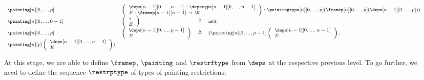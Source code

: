 \documentclass{msc}
\newcommand{\unittype}{\ensuremath{\mathsf{unit}}}
\newcommand{\unitpoint}{\ensuremath{\ast}}
\newcommand{\defeq}{\ensuremath{\triangleq}}
\begin{document}
\begin{equation*}
  \fontsize{7.2}{9}\selectfont
  \begin{array}{llcl}
    \painting[n][0,...,p]          &
    \multicolumn{3}{l}{
      \left(\begin{array}{l}
                \deps[n-1][0,...,n-1]:\depstype[n-1][0,...,n-1] \\
                E:\framep[n-1][n-1]\rightarrow \U               \\
              \end{array}\right) : \paintingtype[n][0,...,p](\framep[n][0,...,p](\deps[n-1][0,...,p]))
    }                                                            \\
    \painting[n][0,...,0-1]          &
    \left(\begin{array}{l}
              \unitpoint \\
              E                     \\
            \end{array}\right) & \defeq & \unittype                        \\
    \painting[n][0,...,p] &
    \left(\begin{array}{l}
              \deps[n-1][0,...,p-1] \\
              E                     \\
            \end{array}\right) & \defeq &
       (\painting[n][0,...,p-1]
       \left(\begin{array}{l}
           \deps[n-1][0,...,n-1] \\
           E                     \\
         \end{array}\right),           \\
       \painting[n][p]
       \left(\begin{array}{l}
           \deps[n-1][0,...,n-1] \\
           E                     \\
         \end{array}\right))           \\
  \end{array}
\end{equation*}

At this stage, we are able to define $\framep$, $\painting$ and $\restrftype$ from $\deps$ at the respective previous level. To go further, we need to define the sequence $\restrptype$ of types of painting restrictions:
\end{document}
